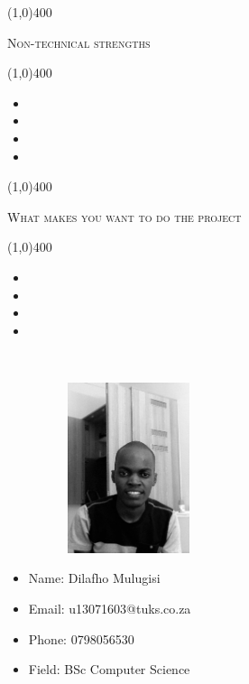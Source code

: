 \documentclass[12pt,a4paper]{report}
\begin{document}
	\begin{center}
	
	\line(1,0){400}\\
	{\scshape\large Non-technical strengths\par}
	\line(1,0){400}\\
	\end{center}
		\begin{itemize}
\item 
\item 
\item 
\item 
\end{itemize}

\begin{center}
	
	\line(1,0){400}\\
	{\scshape\large What makes you want to do the project\par}
	\line(1,0){400}\\
	\end{center}
		\begin{itemize}
\item 
\item 
\item 
\item 
\end{itemize}

\newpage
\vspace*{-3cm}\
\begin{minipage}{0.5\textwidth}
\begin{figure}[H]
\includegraphics[width=5cm,height=5cm,keepaspectratio]{u13071603.jpg}
\end{figure}
\end{minipage} \hfill
\begin{minipage}{0.6\textwidth}
\begin{itemize}
\item[] Name: Dilafho Mulugisi
\item[] Email: u13071603@tuks.co.za
\item[] Phone: 0798056530
\item[] Field: BSc Computer Science
\end{itemize}
\end{minipage}
\end{document}
